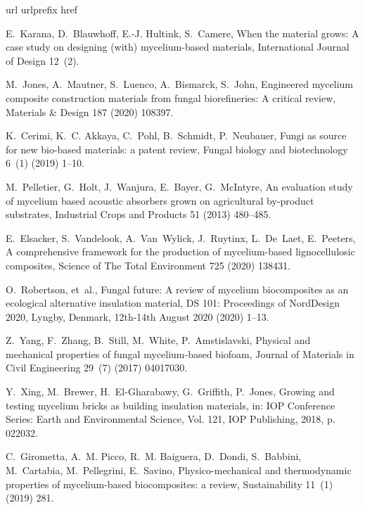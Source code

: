 \documentclass[]{elsarticle}
\begin{document}
\begin{thebibliography}{10}
\expandafter\ifx\csname url\endcsname\relax
  \def\url#1{\texttt{#1}}\fi
\expandafter\ifx\csname urlprefix\endcsname\relax\def\urlprefix{URL }\fi
\expandafter\ifx\csname href\endcsname\relax
  \def\href#1#2{#2} \def\path#1{#1}\fi

E.~Karana, D.~Blauwhoff, E.-J. Hultink, S.~Camere, When the material grows: A
  case study on designing (with) mycelium-based materials, International
  Journal of Design 12~(2).

M.~Jones, A.~Mautner, S.~Luenco, A.~Bismarck, S.~John, Engineered mycelium
  composite construction materials from fungal biorefineries: A critical
  review, Materials \& Design 187 (2020) 108397.

K.~Cerimi, K.~C. Akkaya, C.~Pohl, B.~Schmidt, P.~Neubauer, Fungi as source for
  new bio-based materials: a patent review, Fungal biology and biotechnology
  6~(1) (2019) 1--10.

M.~Pelletier, G.~Holt, J.~Wanjura, E.~Bayer, G.~McIntyre, An evaluation study
  of mycelium based acoustic absorbers grown on agricultural by-product
  substrates, Industrial Crops and Products 51 (2013) 480--485.

E.~Elsacker, S.~Vandelook, A.~Van~Wylick, J.~Ruytinx, L.~De~Laet, E.~Peeters, A
  comprehensive framework for the production of mycelium-based lignocellulosic
  composites, Science of The Total Environment 725 (2020) 138431.

O.~Robertson, et~al., Fungal future: A review of mycelium biocomposites as an
  ecological alternative insulation material, DS 101: Proceedings of NordDesign
  2020, Lyngby, Denmark, 12th-14th August 2020 (2020) 1--13.

Z.~Yang, F.~Zhang, B.~Still, M.~White, P.~Amstislavski, Physical and mechanical
  properties of fungal mycelium-based biofoam, Journal of Materials in Civil
  Engineering 29~(7) (2017) 04017030.

Y.~Xing, M.~Brewer, H.~El-Gharabawy, G.~Griffith, P.~Jones, Growing and testing
  mycelium bricks as building insulation materials, in: IOP Conference Series:
  Earth and Environmental Science, Vol. 121, IOP Publishing, 2018, p. 022032.

C.~Girometta, A.~M. Picco, R.~M. Baiguera, D.~Dondi, S.~Babbini, M.~Cartabia,
  M.~Pellegrini, E.~Savino, Physico-mechanical and thermodynamic properties of
  mycelium-based biocomposites: a review, Sustainability 11~(1) (2019) 281.


\end{thebibliography}
\end{document}
